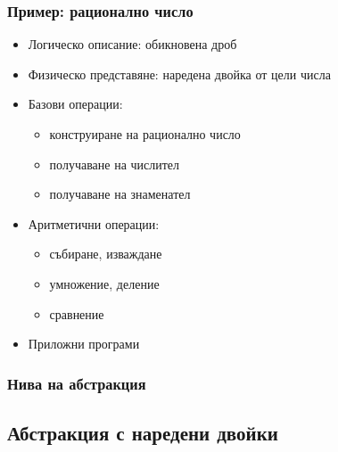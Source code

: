 \documentclass[alsotrans,beameroptions={aspectratio=169}]{beamerswitch}
\begin{document}
\begin{frame}[<+->]
  \frametitle{Пример: рационално число}

  \begin{itemize}
  \item Логическо описание: обикновена дроб
  \item Физическо представяне: наредена двойка от цели числа
  \item Базови операции:
    \begin{itemize}[<.->]
    \item конструиране на рационално число
    \item получаване на числител
    \item получаване на знаменател
    \end{itemize}
  \item Аритметични операции:
    \begin{itemize}[<.->]
    \item събиране, изваждане
    \item умножение, деление
    \item сравнение
    \end{itemize}
  \item Приложни програми
  \end{itemize}
\end{frame}

\begin{frame}
  \frametitle{Нива на абстракция}

  \begin{center}
  \end{center}
\end{frame}

\subsection{Абстракция с наредени двойки}
\end{document}
